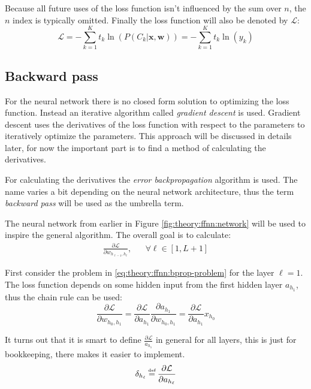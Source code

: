 Because all future uses of the loss function isn't influenced by the sum over $n$, the $n$ index is typically omitted. Finally the loss function will also be denoted by $\mathcal{L}$:
\begin{equation}
\mathcal{L} = - \sum_{k=1}^K t_{k} \ln\left( P(C_{k} | \mathbf{x}, \mathbf{w})\right) =  - \sum_{k=1}^K t_k \ln(y_k)
\label{eq:theory:ffnn:loss}
\end{equation}

\subsection{Backward pass}

For the neural network there is no closed form solution to optimizing the loss function. Instead an iterative algorithm called \textit{gradient descent} is used. Gradient descent uses the derivatives of the loss function with respect to the parameters to iteratively optimize the parameters. This approach will be discussed in details later, for now the important part is to find a method of calculating the derivatives.

For calculating the derivatives the \textit{error backpropagation} algorithm is used. The name varies a bit depending on the neural network architecture, thus the term \textit{backward pass} will be used as the umbrella term.

The neural network from earlier in Figure \ref{fig:theory:ffnn:network} will be used to inspire the general algorithm. The overall goal is to calculate:
\begin{equation}
\begin{aligned}
\frac{\partial \mathcal{L}}{\partial w_{h_{\ell-1}, h_\ell}}, && \forall \ell \in [1, L + 1]
\end{aligned}
\label{eq:theory:ffnn:bprop-problem}
\end{equation} 

First consider the problem in \eqref{eq:theory:ffnn:bprop-problem} for the layer $\ell = 1$. The loss function depends on some hidden input from the first hidden layer $a_{h_1}$, thus the chain rule can be used:
\begin{equation}
\frac{\partial \mathcal{L}}{\partial w_{h_0, h_1}} = \frac{\partial \mathcal{L}}{\partial a_{h_1}} \frac{\partial a_{h_1}}{\partial w_{h_0, h_1}} =  \frac{\partial \mathcal{L}}{\partial a_{h_1}} x_{h_0}
\label{eq:theory:ffnn:bprop-firstlayer}
\end{equation}

It turns out that it is smart to define $\frac{\partial \mathcal{L}}{a_{h_1}}$ in general for all layers, this is just for bookkeeping, there makes it easier to implement.
\begin{equation}
\delta_{h_\ell} \defeq \frac{\partial \mathcal{L}}{\partial a_{h_\ell}}
\end{equation}

